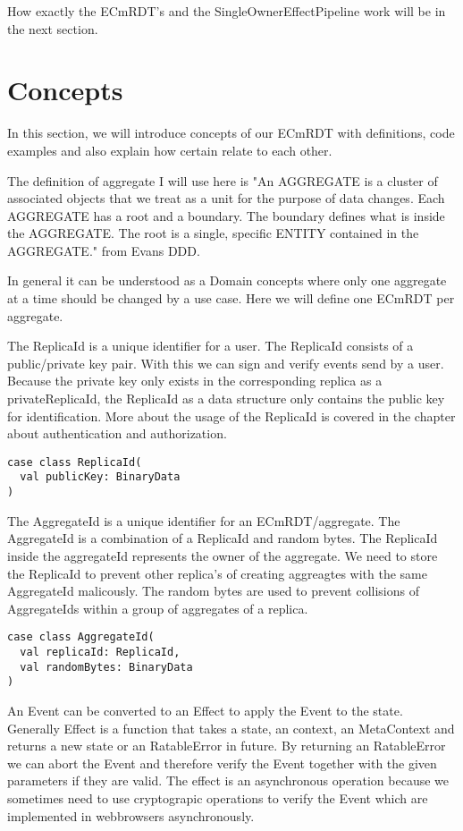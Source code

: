 \documentclass[
	ngerman,
	ruledheaders=section,   %
	class=report,		    %
	thesis={type=bachelor}, %
	accentcolor=9c,			%
	custommargins=false,    %
	marginpar=false,        %
	parskip=half-,          %
	fontsize=11pt,          %
]{tudapub}
\begin{document}
How exactly the ECmRDT's and the SingleOwnerEffectPipeline work will be in the next section.

\section{Concepts}

In this section, we will introduce concepts of our ECmRDT with definitions, code examples and also explain how certain relate to each other.

The definition of aggregate I will use here is "An AGGREGATE is a cluster of associated objects that we treat as a unit for the purpose of data changes. Each AGGREGATE has a root and a boundary. The boundary defines what is inside the AGGREGATE. The root is a single, specific ENTITY contained in the AGGREGATE." from Evans DDD.

In general it can be understood as a Domain concepts where only one aggregate at a time should be changed by a use case. Here we will define one ECmRDT per aggregate. 

The ReplicaId is a unique identifier for a user. The ReplicaId consists of a public/private key pair. With this we can sign and verify events send by a user. Because the private key only exists in the corresponding replica as a privateReplicaId, the ReplicaId as a data structure only contains the public key for identification. More about the usage of the ReplicaId is covered in the chapter about authentication and authorization. 

\begin{lstlisting}
case class ReplicaId(
  val publicKey: BinaryData
)
\end{lstlisting}

The AggregateId is a unique identifier for an ECmRDT/aggregate. The AggregateId is a combination of a ReplicaId and random bytes. The ReplicaId inside the aggregateId represents the owner of the aggregate. We need to store the ReplicaId to prevent other replica's of creating aggreagtes with the same AggregateId malicously. The random bytes are used to prevent collisions of AggregateIds within a group of aggregates of a replica. 

\begin{lstlisting}
case class AggregateId(
  val replicaId: ReplicaId,
  val randomBytes: BinaryData
)
\end{lstlisting}

An Event can be converted to an Effect to apply the Event to the state. Generally Effect is a function that takes a state, an context, an MetaContext and returns a new state or an RatableError in future. By returning an RatableError we can abort the Event and therefore verify the Event together with the given parameters if they are valid. The effect is an asynchronous operation because we sometimes need to use cryptograpic operations to verify the Event which are implemented in webbrowsers asynchronously.
\end{document}
